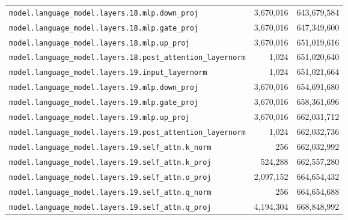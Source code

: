 \documentclass[10pt,a4paper]{article}
\theoremstyle{definition}
\begin{document}
\begin{appendices}
\begin{longtable}{p{9.5cm}rr}
\texttt{model.\allowbreak{}language\_model.\allowbreak{}layers.\allowbreak{}18.\allowbreak{}mlp.\allowbreak{}down\_proj} & 3,670,016 & 643,679,584 \\
\texttt{model.\allowbreak{}language\_model.\allowbreak{}layers.\allowbreak{}18.\allowbreak{}mlp.\allowbreak{}gate\_proj} & 3,670,016 & 647,349,600 \\
\texttt{model.\allowbreak{}language\_model.\allowbreak{}layers.\allowbreak{}18.\allowbreak{}mlp.\allowbreak{}up\_proj} & 3,670,016 & 651,019,616 \\
\texttt{model.\allowbreak{}language\_model.\allowbreak{}layers.\allowbreak{}18.\allowbreak{}post\_attention\_layernorm} & 1,024 & 651,020,640 \\
\texttt{model.\allowbreak{}language\_model.\allowbreak{}layers.\allowbreak{}19.\allowbreak{}input\_layernorm} & 1,024 & 651,021,664 \\
\texttt{model.\allowbreak{}language\_model.\allowbreak{}layers.\allowbreak{}19.\allowbreak{}mlp.\allowbreak{}down\_proj} & 3,670,016 & 654,691,680 \\
\texttt{model.\allowbreak{}language\_model.\allowbreak{}layers.\allowbreak{}19.\allowbreak{}mlp.\allowbreak{}gate\_proj} & 3,670,016 & 658,361,696 \\
\texttt{model.\allowbreak{}language\_model.\allowbreak{}layers.\allowbreak{}19.\allowbreak{}mlp.\allowbreak{}up\_proj} & 3,670,016 & 662,031,712 \\
\texttt{model.\allowbreak{}language\_model.\allowbreak{}layers.\allowbreak{}19.\allowbreak{}post\_attention\_layernorm} & 1,024 & 662,032,736 \\
\texttt{model.\allowbreak{}language\_model.\allowbreak{}layers.\allowbreak{}19.\allowbreak{}self\_attn.\allowbreak{}k\_norm} & 256 & 662,032,992 \\
\texttt{model.\allowbreak{}language\_model.\allowbreak{}layers.\allowbreak{}19.\allowbreak{}self\_attn.\allowbreak{}k\_proj} & 524,288 & 662,557,280 \\
\texttt{model.\allowbreak{}language\_model.\allowbreak{}layers.\allowbreak{}19.\allowbreak{}self\_attn.\allowbreak{}o\_proj} & 2,097,152 & 664,654,432 \\
\texttt{model.\allowbreak{}language\_model.\allowbreak{}layers.\allowbreak{}19.\allowbreak{}self\_attn.\allowbreak{}q\_norm} & 256 & 664,654,688 \\
\texttt{model.\allowbreak{}language\_model.\allowbreak{}layers.\allowbreak{}19.\allowbreak{}self\_attn.\allowbreak{}q\_proj} & 4,194,304 & 668,848,992 \\

\end{longtable}
\end{appendices}
\end{document}
